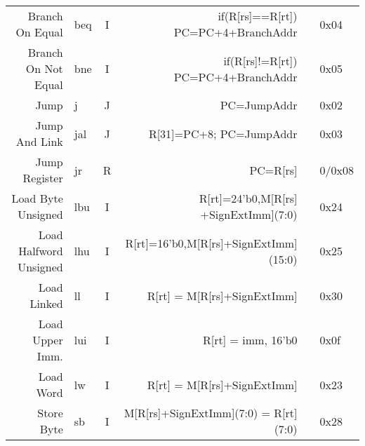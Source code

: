 \begin{tabularx}{\textwidth}{NMcDcO}
    \midrule
    Branch On Equal                                     & beq                                      & I & if(R[rs]==R[rt]) PC=PC+4+BranchAddr                   & \footnotemark[4]                 & 0x04   \\
    Branch On Not Equal                                 & bne                                      & I & if(R[rs]!=R[rt]) PC=PC+4+BranchAddr                   & \footnotemark[4]                 & 0x05   \\
    Jump                                                & j                                        & J & PC=JumpAddr                                           & \footnotemark[5]                 & 0x02   \\
    Jump And Link                                       & jal                                      & J & R[31]=PC+8; PC=JumpAddr                               & \footnotemark[5]\footnotemark[7] & 0x03   \\
    Jump Register                                       & jr                                       & R & PC=R[rs]                                              &                                  & 0/0x08 \\
    \midrule
    Load Byte Unsigned                                  & lbu                                      & I & R[rt]={24'b0,M[R[rs] +SignExtImm](7:0)}               & \footnotemark[2]                 & 0x24   \\
    Load Halfword Unsigned                              & lhu                                      & I & R[rt]={16'b0,M[R[rs]+SignExtImm](15:0)}               & \footnotemark[2]                 & 0x25   \\
    Load Linked                                         & ll                                       & I & R[rt] = M[R[rs]+SignExtImm]                           & \footnotemark[2]\footnotemark[7] & 0x30   \\
    Load Upper Imm.                                     & lui                                      & I & R[rt] = {imm, 16'b0}                                  &                                  & 0x0f   \\
    Load Word                                           & lw                                       & I & R[rt] = M[R[rs]+SignExtImm]                           & \footnotemark[2]                 & 0x23   \\
    Store Byte                                          & sb                                       & I & M[R[rs]+SignExtImm](7:0) = R[rt](7:0)                 & \footnotemark[2]                 & 0x28   \\

\end{tabularx}
